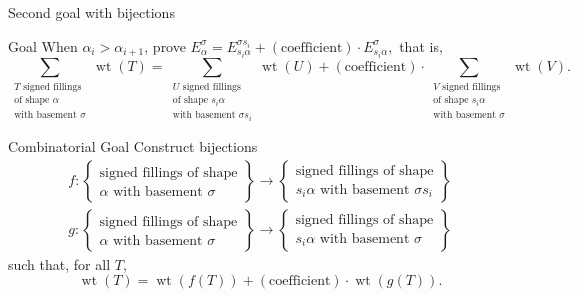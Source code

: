 \documentclass[aspectratio = 1609]{beamer}
\theoremstyle{definition}
\theoremstyle{plain} %
\DeclareMathOperator{\wt}{wt}
\begin{document}
\begin{frame}{Second goal with bijections}
  \begin{block}{Goal}
    When \(\alpha_i > \alpha_{i+1}\), prove
    \(
      E_\alpha^\sigma = 
      E_{s_i \alpha}^{\sigma s_i} +
      (\text{coefficient}) \cdot
      E_{s_i \alpha}^\sigma,
    \)
    that is,
    \[
      \textstyle
      \sum_{\substack{T \text{ signed fillings} \\ \text{of shape } \alpha \\ \text{with basement } \sigma}}
      \wt(T)
      =
      \sum_{\substack{U \text{ signed fillings} \\ \text{of shape } s_i \alpha \\ \text{with basement } \sigma s_i}}
      \wt(U)
      +
      (\text{coefficient}) \cdot
      \sum_{\substack{V \text{ signed fillings} \\ \text{of shape } s_i \alpha \\ \text{with basement } \sigma}}
      \wt(V).
    \]
  \end{block}

  \begin{block}{Combinatorial Goal}
    Construct bijections
    \begin{gather*}
      f \colon \left\{ \begin{array}{c} \text{signed fillings of shape} \\ \alpha \text{ with basement } \sigma \end{array} \right\}
      \to
      \left\{ \begin{array}{c} \text{signed fillings of shape} \\ s_i \alpha \text{ with basement } \sigma s_i \end{array} \right\} \\
      g \colon \left\{ \begin{array}{c} \text{signed fillings of shape} \\ \alpha \text{ with basement } \sigma \end{array} \right\}
      \to
      \left\{ \begin{array}{c} \text{signed fillings of shape} \\ s_i \alpha \text{ with basement } \sigma \end{array} \right\}
    \end{gather*}
    such that, for all \(T\),
    \[
    \wt(T) = \wt(f(T)) + (\text{coefficient}) \cdot \wt(g(T)).
    \]
  \end{block}
\end{frame}
\end{document}

